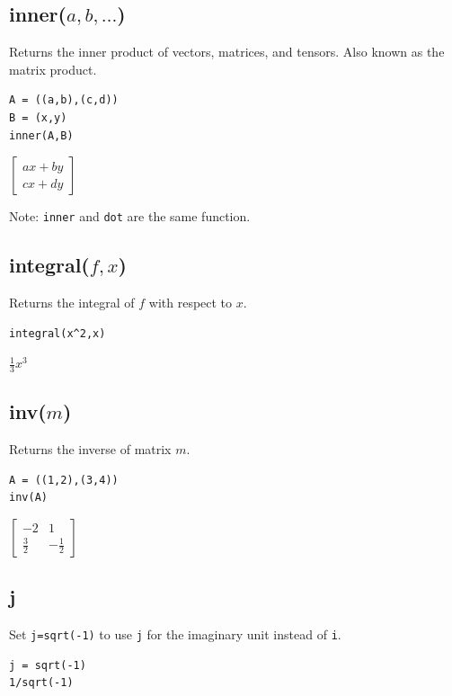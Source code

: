 \documentclass[12pt]{article}
\begin{document}
\subsection*{inner($a,b,\ldots$)}

Returns the inner product of vectors, matrices, and tensors.
Also known as the matrix product.

{\color{blue}
\begin{verbatim}
A = ((a,b),(c,d))
B = (x,y)
inner(A,B)
\end{verbatim}
}

$\displaystyle
\begin{bmatrix}
ax+by
\\[1ex]
cx+dy
\end{bmatrix}
$

\bigskip
Note: {\tt inner} and {\tt dot} are the same function.

\subsection*{integral($f,x$)}

Returns the integral of $f$ with respect to $x$.

{\color{blue}
\begin{verbatim}
integral(x^2,x)
\end{verbatim}
}

$\displaystyle \tfrac{1}{3}x^3$

\subsection*{inv($m$)}

Returns the inverse of matrix $m$.

{\color{blue}
\begin{verbatim}
A = ((1,2),(3,4))
inv(A)
\end{verbatim}
}

$\displaystyle
\begin{bmatrix}
-2 & 1
\\[1ex]
\tfrac{3}{2} & -\tfrac{1}{2}
\end{bmatrix}
$

\subsection*{j}

Set {\tt j=sqrt(-1)} to use {\tt j} for the imaginary unit instead of {\tt i}.

{\color{blue}
\begin{verbatim}
j = sqrt(-1)
1/sqrt(-1)
\end{verbatim}
}
\end{document}
